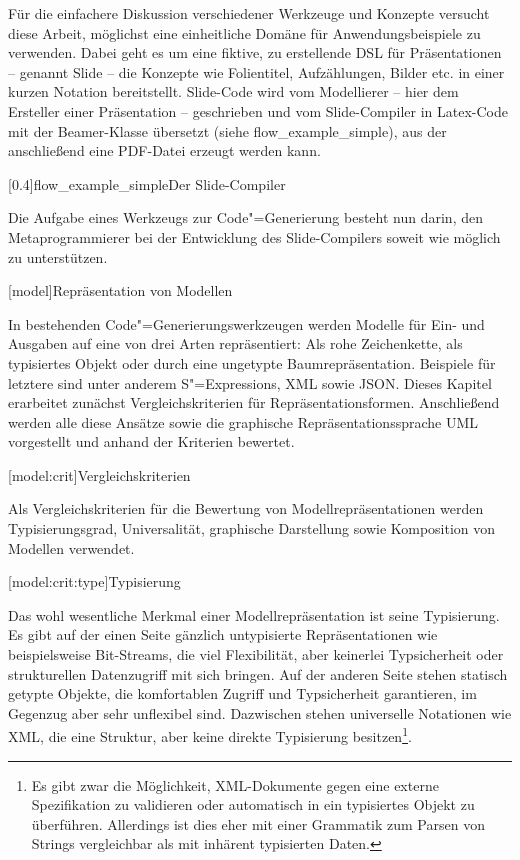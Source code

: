 \documentclass[12pt, a4paper, bibgerm]{scrbook}
\newcommand\lchapter{}
\newcommand\lsection{}
\newcommand\lsubsection{}
\newcommand\abb{}
\newcommand\fig{}
\newcommand{\seea}[1]{(siehe \abb{#1})}
\newcommand{\sexps}{S"=Expressions}
\newcommand{\cgen}{Code"=Generierung}
\begin{document}
Für die einfachere Diskussion verschiedener Werkzeuge und Konzepte
versucht diese Arbeit, möglichst eine einheitliche Domäne für
Anwendungsbeispiele zu verwenden. Dabei geht es um eine fiktive, zu
erstellende DSL für Präsentationen -- genannt Slide -- die Konzepte wie
Folientitel, Aufzählungen, Bilder etc. in einer kurzen
Notation bereitstellt. Slide-Code wird vom Modellierer -- hier dem
Ersteller einer Präsentation -- geschrieben und vom Slide-Compiler in
Latex-Code \cite{Latex} mit der Beamer-Klasse \cite{LatexBeamer} übersetzt
\seea{flow_example_simple}, aus der anschließend eine PDF-Datei erzeugt
werden kann.

\fig[0.4]{flow_example_simple}{Der Slide-Compiler} 

Die Aufgabe eines Werkzeugs zur \cgen{} besteht nun darin, den
Metaprogrammierer bei der Entwicklung des Slide-Compilers soweit wie
möglich zu unterstützen.

\lchapter[model]{Repräsentation von Modellen}

In bestehenden \cgen{}swerkzeugen werden Modelle für Ein- und Ausgaben
auf eine von drei Arten repräsentiert: Als rohe Zeichenkette, als
typisiertes Objekt oder durch eine ungetypte
Baumrepräsentation. Beispiele für letztere sind unter anderem \sexps{},
XML sowie JSON. Dieses Kapitel erarbeitet zunächst Vergleichskriterien
für Repräsentationsformen. Anschließend werden alle diese Ansätze sowie
die graphische Repräsentationssprache UML vorgestellt und anhand der
Kriterien bewertet.

\lsection[model:crit]{Vergleichskriterien}

Als Vergleichskriterien für die Bewertung von
Modellrepräsentationen werden Typisierungsgrad, Universalität,
graphische Darstellung sowie Komposition von Modellen verwendet.

\lsubsection[model:crit:type]{Typisierung}

Das wohl wesentliche Merkmal einer Modellrepräsentation ist seine
Typisierung. Es gibt auf der einen Seite gänzlich untypisierte
Repräsentationen wie beispielsweise Bit-Streams, die viel Flexibilität,
aber keinerlei Typsicherheit oder strukturellen Datenzugriff mit sich
bringen. Auf der anderen Seite stehen statisch getypte Objekte, die
komfortablen Zugriff und Typsicherheit garantieren, im Gegenzug aber
sehr unflexibel sind. Dazwischen stehen universelle Notationen wie XML,
die eine Struktur, aber keine direkte Typisierung besitzen\footnote{Es
  gibt zwar die Möglichkeit, XML-Dokumente gegen eine externe
  Spezifikation zu validieren oder automatisch in ein typisiertes Objekt
zu überführen. Allerdings ist dies eher mit einer Grammatik
zum Parsen von Strings vergleichbar als mit inhärent typisierten Daten.}.
\end{document}
